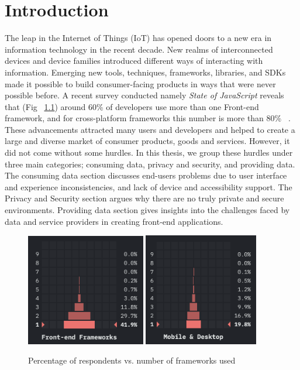 
\chapter{Introduction}

The leap in the Internet of Things (IoT) has opened doors to a new era in information technology in the recent decade. New realms of interconnected devices and device families introduced different ways of interacting with information. Emerging new tools, techniques, frameworks, libraries, and SDKs made it possible to build consumer-facing products in ways that were never possible before. A recent survey conducted namely \textit{State of JavaScript} reveals that (Fig ~\ref{fig:num_of_frameworks_used}) around 60\% of developers use more than one Front-end framework, and for cross-platform frameworks this number is more than 80\% ~\cite{StateOfJs2020}. These advancements attracted many users and developers and helped to create a large and diverse market of consumer products, goods and services. However, it did not come without some hurdles. In this thesis, we group these hurdles under three main categories; consuming data, privacy and security, and providing data. The consuming data section discusses end-users problems due to user interface and experience inconsistencies, and lack of device and accessibility support. The Privacy and Security section argues why there are no truly private and secure environments. Providing data section gives insights into the challenges faced by data and service providers in creating front-end applications.

\begin{figure}
  \centering
  \includegraphics[width=5.2cm]{images/frontend_frameworks_2020.png}
  \qquad
  \includegraphics[width=5cm]{images/hybrid_frameworks_2020.png}
  \caption{Percentage of respondents vs. number of frameworks used}%
  \label{fig:num_of_frameworks_used}%
\end{figure}

